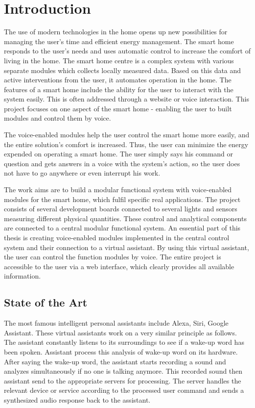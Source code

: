 \chapter{Introduction} \label{chap:introduction}

The use of modern technologies in the home opens up new possibilities for managing the user's time and efficient energy management. The smart home responds to the user's needs and uses automatic control to increase the comfort of living in the home. The smart home centre is a complex system with various separate modules which collects locally measured data. Based on this data and active interventions from the user, it automates operation in the home. The features of a smart home include the ability for the user to interact with the system easily. This is often addressed through a website or voice interaction. This project focuses on one aspect of the smart home - enabling the user to built modules and control them by voice.


The voice-enabled modules help the user control the smart home more easily, and the entire solution's comfort is increased. Thus, the user can minimize the energy expended on operating a smart home. The user simply says his command or question and gets answers in a voice with the system's action, so the user does not have to go anywhere or even interrupt his work.


The work aims are to build a modular functional system with voice-enabled modules for the smart home, which fulfil specific real applications. The project consists of several development boards connected to several lights and sensors measuring different physical quantities. These control and analytical components are connected to a central modular functional system. An essential part of this thesis is creating voice-enabled modules implemented in the central control system and their connection to a virtual assistant. By using this virtual assistant, the user can control the function modules by voice. The entire project is accessible to the user via a web interface, which clearly provides all available information.

\section{State of the Art} \label{sec:state_of_the_art}


The most famous intelligent personal assistants include Alexa, Siri, Google Assistant. These virtual assistants work on a very similar principle as follows. The assistant constantly listens to its surroundings to see if a wake-up word has been spoken. Assistant process this analysis of wake-up word on its hardware. After saying the wake-up word, the assistant starts recording a sound and analyzes simultaneously if no one is talking anymore. This recorded sound then assistant send to the appropriate servers for processing. The server handles the relevant device or service according to the processed user command and sends a synthesized audio response back to the assistant.

